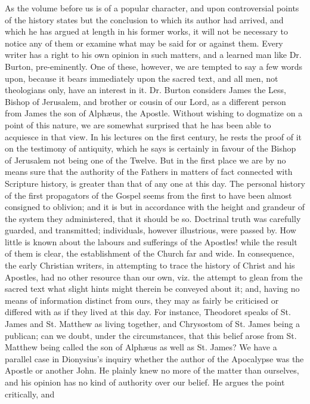 As the
volume before us is of a popular character, and upon controversial
points of the history states but the conclusion to which its author had
arrived, and which he has argued at length in his former works, it will
not be necessary to notice any of them or examine what may be said for
or against them. Every writer has a right to his own opinion in such
matters, and a learned man like Dr. Burton, pre-eminently. One of these,
however, we are tempted to say a few words upon, because it bears
immediately upon the sacred text, and all men, not theologians only,
have an interest in it. Dr. Burton considers James the Less, Bishop of
Jerusalem, and brother or cousin of our Lord, as a different person from
James the son of Alphæus, the Apostle. Without wishing to dogmatize on
a point of this nature, we are somewhat surprised that he has been able
to acquiesce in that view. In his lectures on the first century, he
rests the proof of it on the testimony of antiquity, which he says is
certainly in favour of the Bishop of Jerusalem not being one of the
Twelve. But in the first place we are by no means sure that the
authority of the Fathers in matters of fact connected with Scripture
history, is greater than that of any one at this day. The personal
history of the first propagators of the Gospel seems from the first to
have been almost consigned to oblivion; and it is but in accordance with
the height and grandeur of the system they administered, that it should
be so. Doctrinal truth was carefully guarded, and transmitted;
individuals, however illustrious, were passed by. How little is known
about the labours and sufferings of the Apostles! while the result of
them is clear, the establishment of the Church far and wide. In
consequence, the early Christian writers, in attempting to trace the
history of Christ and his Apostles, had no other resource than our own,
viz. the attempt to glean from the sacred text what slight hints might
therein be conveyed about it; and, having no means of information
distinct from ours, they may as fairly be criticised or differed with as
if they lived at this day. For instance, Theodoret speaks of St. James
and St. Matthew as living together, and Chrysostom of St. James being a
publican; can we doubt, under the circumstances, that this belief arose
from St. Matthew being called the son of Alphæus as well as St. James?
We have a parallel case in Dionysius's inquiry whether the author of
the Apocalypse was the Apostle or another John. He plainly knew no
more of the matter than ourselves, and his opinion has no kind of
authority over our belief. He argues the point critically, and
